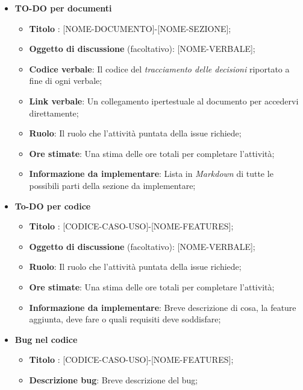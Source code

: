         \begin{itemize}
            \item  \textbf{TO-DO per documenti}
            \begin{itemize}
                \item \textbf{Titolo} : [NOME-DOCUMENTO]-[NOME-SEZIONE];
                \item \textbf{Oggetto di discussione} (facoltativo): [NOME-VERBALE];
                \item \textbf{Codice verbale}: Il codice del \textit{tracciamento delle decisioni} riportato a fine di ogni verbale;
                \item \textbf{Link verbale}: Un collegamento ipertestuale al documento per accedervi direttamente;
                \item \textbf{Ruolo}: Il ruolo che l'attività puntata della issue richiede;
                \item \textbf{Ore stimate}: Una stima delle ore totali per completare l'attività;
                \item \textbf{Informazione da implementare}: Lista in \textit{Markdown} di tutte le possibili parti della sezione da implementare;
            \end{itemize}
            \item  \textbf{To-DO per codice}
            \begin{itemize}
                \item \textbf{Titolo} : [CODICE-CASO-USO]-[NOME-FEATURES];
                \item \textbf{Oggetto di discussione} (facoltativo): [NOME-VERBALE];
                \item \textbf{Ruolo}: Il ruolo che l'attività puntata della issue richiede;
                \item \textbf{Ore stimate}: Una stima delle ore totali per completare l'attività;
                \item \textbf{Informazione da implementare}: Breve descrizione di cosa, la feature aggiunta, deve fare o quali requisiti deve soddisfare;
            \end{itemize}
            \item  \textbf{Bug nel codice}
            \begin{itemize}
                \item \textbf{Titolo} : [CODICE-CASO-USO]-[NOME-FEATURES];
                \item \textbf{Descrizione bug}: Breve descrizione del bug;

\end{itemize}
\end{itemize}
